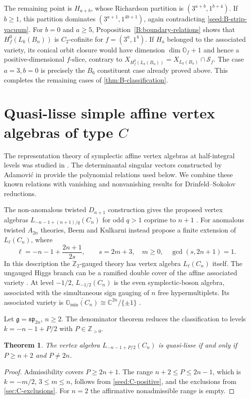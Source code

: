 \documentclass[11pt,a4paper]{amsart}
\numberwithin{equation}{section}
\newtheorem{theorem}{Theorem}[section]
\theoremstyle{definition}
\theoremstyle{remark}
\newcommand{\C}{\mathbb C}
\newcommand{\Z}{\mathbb Z}
\newcommand{\g}{\mathfrak g}
\newcommand{\OO}{\mathbb O}
\newcommand{\spg}{\mathfrak{sp}}
\begin{document}
The remaining point is $H_{a+b}$, whose Richardson partition is
$(3^{a+b},1^{b+4})$. If $b\geq1$, this partition dominates
$(3^{a+1},1^{4b+1})$, again contradicting
\eqref{seed:B-strip-vacuum}.
For $b=0$ and $a\geq5$, Proposition~\ref{B:boundary-relations}
shows that $H_f^0(L_k(B_n))$ is $C_2$-cofinite for $f=(3^a,1^4)$.
If $H_a$ belonged to the associated variety, its conical orbit closure
would have dimension
$\dim\OO_f+1$ and hence a positive-dimensional $f$-slice,
contrary to $X_{H_f^0(L_k(B_n))}=X_{L_k(B_n)}\cap\mathcal S_f$.
The case $a=3,b=0$ is precisely the $B_6$ constituent case already
proved above. This completes the remaining cases of
\cref{thm:B-classification}.


\section{\texorpdfstring{Quasi-lisse simple affine vertex algebras of type $C$}{Quasi-lisse simple affine vertex algebras of type C}}\label{sec:type-C}

The representation theory of symplectic affine vertex algebras at
half-integral levels was studied in \cite{AdamovicThesis1996}.
The determinantal singular vectors constructed by Adamovi\'c in
\cite[Theorem~4.1]{Adamovic2003} provide the polynomial relations
used below. We combine these known relations with vanishing and
nonvanishing results for Drinfeld--Sokolov reductions.

The non-anomalous twisted $D_{n+1}$ construction gives the proposed
vertex algebras $L_{-n-1+(n+1)/q}(C_n)$ for odd $q>1$ coprime
to $n+1$ \cite[Section~5]{WangXie2019}.
For anomalous twisted $A_{2n}$ theories, Beem and Kulkarni instead
propose a finite extension of $L_\ell(C_n)$, where
$$
 \ell=-n-1+\frac{2n+1}{2s},\qquad
 s=2m+3,\quad m\ge0,\quad\gcd(s,2n+1)=1.
$$
In this description the $\mathbb Z_2$-gauged theory has vertex algebra
$L_\ell(C_n)$ itself. The ungauged Higgs branch can be a ramified
double cover of the affine associated variety
\cite[Sections~4--6]{BeemKulkarni2026}.
At level $-1/2$, $L_{-1/2}(C_n)$ is the even symplectic-boson
algebra, associated with the simultaneous sign gauging of $n$ free
hypermultiplets. Its associated variety is
$\overline{\OO_{\min}(C_n)}\cong\C^{2n}/\{\pm1\}$
\cite[Section~1.1]{BeemKulkarni2026}.

Let $\g=\spg_{2n}$, $n\ge2$. The denominator theorem reduces the
classification to levels $k=-n-1+P/2$ with $P\in\Z_{>0}$.

\begin{theorem}\label{thm:C-seeds}
The vertex algebra $L_{-n-1+P/2}(C_n)$ is quasi-lisse if and only if
$P\ge n+2$ and $P\ne2n$.
\end{theorem}
\begin{proof}
Admissibility covers $P\ge2n+1$. The range $n+2\le P\le2n-1$,
which is $k=-m/2$, $3\le m\le n$, follows from
\cref{seed:C-positive}, and the exclusions from \cref{sec:C-exclusions}.
For $n=2$ the affirmative nonadmissible range is empty.
\end{proof}
\end{document}
